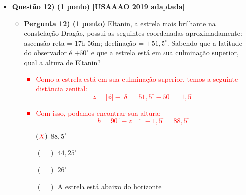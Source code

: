 \documentclass[a4paper, 12pt]{article}
\newcommand{\red}[1]{\textcolor{red}{#1}}
\begin{document}
\begin{flushleft}
\begin{itemize}
            \item \textbf{Questão 12) (1 ponto) [USAAAO 2019 adaptada]}
                \begin{itemize}
                    \item \textbf{Pergunta 12) (1 ponto)} Eltanin, a estrela mais brilhante na constelação Dragão, possui as seguintes coordenadas aproximadamente: ascensão reta = 17h 56m; declinação = $+51,5^{\circ}$. Sabendo que a latitude do observador é $+50^{\circ}$ e que a estrela está em sua culminação superior, qual a altura de Eltanin?
                        \red{\begin{itemize}
                            \item Como a estrela está em sua culminação superior, temos a seguinte distância zenital:
                                \begin{equation*}
                                    z=|\phi|-|\delta| = 51,5^{\circ}-50^{\circ}=1,5^{\circ}
                                \end{equation*}
                            \item Com isso, podemos encontrar sua altura:
                                \begin{equation*}
                                    h=90^{\circ}-z=^{\circ}-1,5^{\circ}=88,5^{\circ}
                                \end{equation*}
                        \end{itemize}}
                        \begin{itemize}
                            \item[$(\red{X})$] $88,5^{\circ}$
                            \item[$(\quad)$] $44,25^{\circ}$
                            \item[$(\quad)$] $26^{\circ}$
                            \item[$(\quad)$] A estrela está abaixo do horizonte
                        \end{itemize}
                \end{itemize}
            

\end{itemize}
\end{flushleft}
\end{document}
